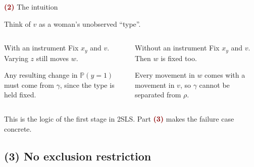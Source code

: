 \documentclass[aspectratio=169,11pt]{beamer}
\newcommand{\Pp}{\mathbb{P}}
\newcommand{\Part}[1]{\textcolor{DarkRed}{\textbf{(#1)}}}
\begin{document}
\begin{frame}{\Part{2} The intuition}

Think of $v$ as a woman's unobserved ``type''.

\vspace{0.3em}

\begin{columns}[T]
\begin{block}{With an instrument}
Fix $x_y$ and $v$. Varying $z$ still moves $w$.

Any resulting change in $\Pp(y=1)$ must come from $\gamma$, since the
type is held fixed.
\end{block}

\begin{block}{Without an instrument}
Fix $x_y$ and $v$. Then $w$ is fixed too.

Every movement in $w$ comes with a movement in $v$, so $\gamma$ cannot be
separated from $\rho$.
\end{block}
\end{columns}

\vspace{0.6em}

\begin{center}
\end{center}

\vspace{0.4em}

This is the logic of the first stage in 2SLS. Part \Part{3} makes the
failure case concrete.

\end{frame}

\subsection{(3) No exclusion restriction}
\end{document}
